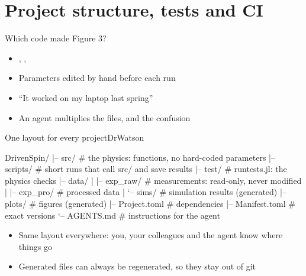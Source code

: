 
\section{Project structure, tests and CI}

\begin{frame}{Which code made Figure 3?}
  \begin{itemize}
    \item {}, , 
    \item Parameters edited by hand before each run
    \item<2-> ``It worked on my laptop last spring''
    \item<3-> An agent multiplies the files, and the confusion
  \end{itemize}

  \vspace{3ex}
\end{frame}

\begin{frame}[fragile]{One layout for every project}{DrWatson}
\begin{terminal}[title={\hfill\tiny\color{unibasGrey}\smallcapsline{julia> using DrWatson; initialize\_project("DrivenSpin")}}]
DrivenSpin/
|-- src/            # the physics: functions, no hard-coded parameters
|-- scripts/        # short runs that call src/ and save results
|-- test/           # runtests.jl: the physics checks
|-- data/
|   |-- exp_raw/    # measurements: read-only, never modified
|   |-- exp_pro/    # processed data
|   `-- sims/       # simulation results (generated)
|-- plots/          # figures (generated)
|-- Project.toml    # dependencies
|-- Manifest.toml   # exact versions
`-- AGENTS.md       # instructions for the agent
\end{terminal}
  \begin{itemize}
    \item<2-> Same layout everywhere: you, your colleagues and the agent know where things go
    \item<3-> Generated files can always be regenerated, so they stay out of git
  \end{itemize}

\end{frame}

